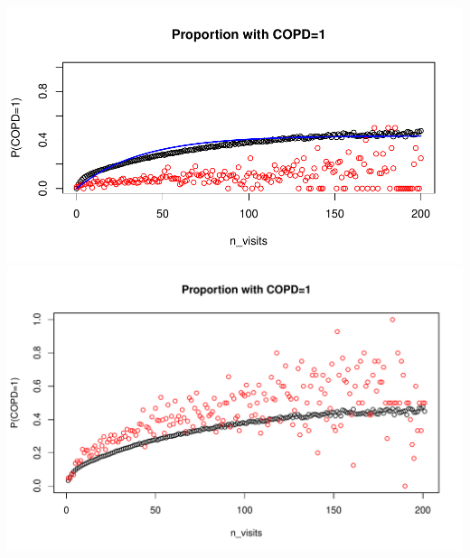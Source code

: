 \documentclass[12pt]{article}
\begin{document}
\begin{center}
\includegraphics[width=.9\textwidth]{nvisits_scatterCOPD200.pdf}
\includegraphics[width=.9\textwidth]{nvisits_scatterCOPDnew.pdf}
\end{center}
\end{document}
